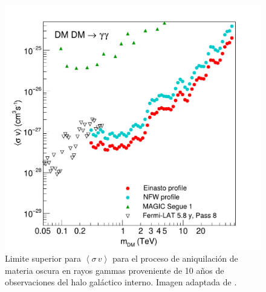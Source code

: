 


\begin{figure}[h!]
\centering
\includegraphics[scale=0.5]{Images/HESS.pdf}
\caption[Limites para $\left< \sigma \, v \right>$ provenientes de H.E.S.S.]{Limite superior para $\left< \sigma \, v \right>$ para el proceso de aniquilación de materia oscura en rayos gammas proveniente de 10 años de observaciones del halo galáctico interno. Imagen adaptada  de \cite{HESS:2018cbt}.}
\label{HESS_sigmav}
\end{figure}

